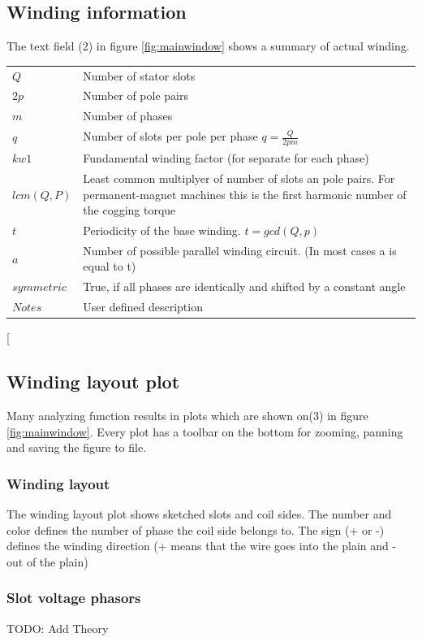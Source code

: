 \documentclass[]{scrreprt}
\begin{document}
\subsection{Winding information}
The text field (2) in figure \ref{fig:mainwindow} shows a summary of actual winding. 
%
\begin{center}
\begin{table}[h]
\begin{tabularx}{\textwidth}{lX}
$Q$ & Number of stator slots \\
$2p$ & Number of pole pairs  \\
$m$ & Number of phases \\
$q$ & Number of slots per pole per phase $q=\frac{Q}{2pm}$ \\
$kw1$ & Fundamental winding factor (for separate for each phase) \\
$lcm(Q,P)$ & Least common multiplyer of number of slots an pole pairs. For permanent-magnet machines this is the first harmonic  number of the cogging torque \\
$t$ & Periodicity of the base winding. $t = gcd(Q, p)$ \\
$a$ & Number of possible parallel winding circuit. (In most cases a is equal to t) \\
$symmetric$ & True, if all phases are identically and shifted by a constant angle \\
$Notes$ & User defined description \\
\end{tabularx}
\end{table}[
\end{center}


%
%
%
%
\subsection{Winding layout plot}
Many analyzing function results in plots which are shown on(3) in figure \ref{fig:mainwindow}.
Every plot has a toolbar on the bottom for zooming, panning and saving the figure to file.
%
%
\subsubsection{Winding layout}
The winding layout plot shows sketched slots and coil sides. The number and color defines the number
of phase the coil side belongs to. The sign (+ or -) defines the winding direction (+ means that the
wire goes into the plain and - out of the plain)
%
%
\subsubsection{Slot voltage phasors}
TODO: Add Theory
%
%
\end{document}
